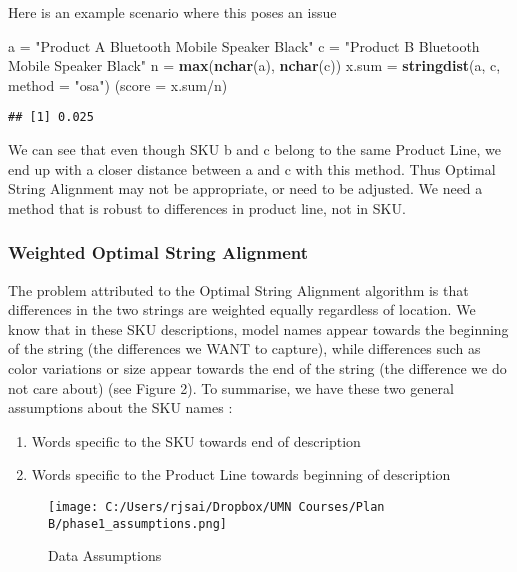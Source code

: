 \documentclass[]{article}
\newenvironment{Shaded}{\begin{snugshade}}{\end{snugshade}}
\newcommand{\KeywordTok}[1]{\textcolor[rgb]{0.13,0.29,0.53}{\textbf{{#1}}}}
\newcommand{\DataTypeTok}[1]{\textcolor[rgb]{0.13,0.29,0.53}{{#1}}}
\newcommand{\StringTok}[1]{\textcolor[rgb]{0.31,0.60,0.02}{{#1}}}
\newcommand{\NormalTok}[1]{{#1}}
\providecommand{\tightlist}{%
  \setlength{\itemsep}{0pt}\setlength{\parskip}{0pt}}
\begin{document}
Here is an example scenario where this poses an issue

\begin{Shaded}
\begin{Highlighting}[]
\NormalTok{a =}\StringTok{ "Product A Bluetooth Mobile Speaker Black"}
\NormalTok{c =}\StringTok{ "Product B Bluetooth Mobile Speaker Black"}
\NormalTok{n =}\StringTok{ }\KeywordTok{max}\NormalTok{(}\KeywordTok{nchar}\NormalTok{(a), }\KeywordTok{nchar}\NormalTok{(c))}
\NormalTok{x.sum =}\StringTok{ }\KeywordTok{stringdist}\NormalTok{(a, c, }\DataTypeTok{method =} \StringTok{"osa"}\NormalTok{)}
\NormalTok{(}\DataTypeTok{score =} \NormalTok{x.sum/n)}
\end{Highlighting}
\end{Shaded}

\begin{verbatim}
## [1] 0.025
\end{verbatim}

We can see that even though SKU b and c belong to the same Product Line,
we end up with a closer distance between a and c with this method. Thus
Optimal String Alignment may not be appropriate, or need to be adjusted.
We need a method that is robust to differences in product line, not in
SKU.

\subsubsection{Weighted Optimal String
Alignment}\label{weighted-optimal-string-alignment}

The problem attributed to the Optimal String Alignment algorithm is that
differences in the two strings are weighted equally regardless of
location. We know that in these SKU descriptions, model names appear
towards the beginning of the string (the differences we WANT to
capture), while differences such as color variations or size appear
towards the end of the string (the difference we do not care about) (see
Figure 2). To summarise, we have these two general assumptions about the
SKU names :

\begin{enumerate}
\def\labelenumi{\arabic{enumi})}
\tightlist
\item
  Words specific to the SKU towards end of description
\item
  Words specific to the Product Line towards beginning of description
\end{enumerate}

\begin{figure}
\centering
\texttt{[image: C:/Users/rjsai/Dropbox/UMN Courses/Plan B/phase1\_assumptions.png]}
\caption{Data Assumptions}
\end{figure}
\end{document}
